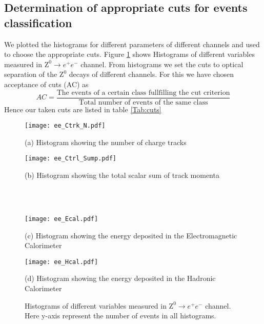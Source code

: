 \subsection{Determination of appropriate cuts for events classification}
We plotted the histograms for different parameters of different channels and used to choose the appropriate cuts. Figure \ref{Fig:histograms} shows Histograms of different variables measured in $  \text{Z}^0\rightarrow e^+e^- $ channel. From histograms we set the cuts to optical separation of the $ \text{Z}^0 $ decays of different channels. For this we have chosen acceptance of cuts (AC) as
\begin{equation}
AC= \frac{\text{The events of a certain class fullfilling the cut criterion}}{\text{Total number of events of the same class}}
\end{equation}
Hence our taken cuts are listed in table \ref{Tab:cuts}

  
\begin{figure}[H]   
	\begin{minipage}[t]{0.5\textwidth}
		\texttt{[image: ee\_Ctrk\_N.pdf]}
		\begin{center}
			{(a) Histogram showing the number of charge tracks}
		\end{center}
	\end{minipage} \quad
	\begin{minipage}[t]{0.5\textwidth}
		\texttt{[image: ee\_Ctrl\_Sump.pdf]}
		\begin{center}
			{(b) Histogram showing the total scalar sum of track momenta}
		\end{center}
	\end{minipage}\\\\
	
	
	\begin{minipage}[t]{0.5\textwidth}
		\texttt{[image: ee\_Ecal.pdf]}
		\begin{center}
			{(c) Histogram showing the energy deposited in the Electromagnetic Calorimeter}
		\end{center}
	\end{minipage} \quad
	\begin{minipage}[t]{0.5\textwidth}
		\texttt{[image: ee\_Hcal.pdf]}
		\begin{center}
			{(d) Histogram showing the energy deposited in the Hadronic Calorimeter}
		\end{center}
	\end{minipage}
	\caption{Histograms of different variables measured in $  \text{Z}^0\rightarrow e^+e^- $ channel. Here y-axis represent the number of events in all histograms.}
\label{Fig:histograms}	
\end{figure}

